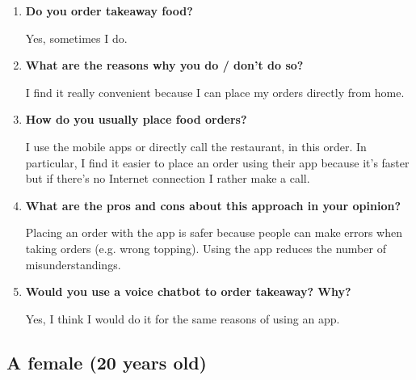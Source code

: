 \begin{enumerate}

\item \textbf{Do you order takeaway food?}

Yes, sometimes I do.

\item \textbf{What are the reasons why you do / don't do so?}

I find it really convenient because I can place my orders directly from home.

\item \textbf{How do you usually place food orders?}

I use the mobile apps or directly call the restaurant, in this order. In particular, I find it easier to place an order using their app because it's faster but if there's no Internet connection I rather make a call.

\item \textbf{What are the pros and cons about this approach in your opinion?}

Placing an order with the app is safer because people can make errors when taking orders (e.g. wrong topping). Using the app reduces the number of misunderstandings.

\item \textbf{Would you use a voice chatbot to order takeaway? Why?}

Yes, I think I would do it for the same reasons of using an app.

\end{enumerate}


\subsection*{A female (20 years old)}

